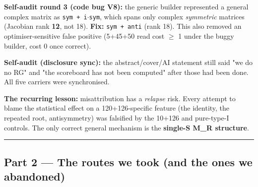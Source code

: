 \documentclass[11pt]{article}
\begin{document}
\textbf{Self-audit round 3 (code bug V8):} the generic builder represented a general
complex matrix as \texttt{sym + i$\cdot$sym}, which spans only complex \emph{symmetric} matrices
(Jacobian rank \textbf{12}, not 18). \textbf{Fix:} \texttt{sym + anti} (rank 18). This also removed an
optimiser-sensitive false positive (5+45+50 read cost $\geq$ 1 under the buggy builder,
cost 0 once correct).

\textbf{Self-audit (disclosure sync):} the abstract/cover/AI statement still said "we do
no RG" and "the scoreboard has not been computed" after those had been done. All
five carriers were synchronised.

\textbf{The recurring lesson:} misattribution has a \emph{relapse} risk. Every attempt to
blame the statistical effect on a 120+126-specific feature (the identity, the
repeated root, antisymmetry) was falsified by the 10+126 and pure-type-I controls.
The only correct general mechanism is the \textbf{single-S M\_R structure}.

\vspace{4pt}\hrule\vspace{4pt}

\subsection*{Part 2 --- The routes we took (and the ones we abandoned)}
\end{document}
